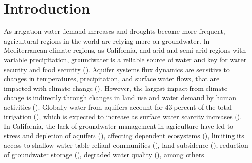 \documentclass[11pt,a4paper]{article}
\begin{document}
\section{Introduction}


As irrigation water demand increases and droughts become more frequent, agricultural regions in the world are relying more on groundwater. In Mediterranean climate regions, as California, and arid and semi-arid regions with variable precipitation, groundwater is a reliable source of water and key for water security and food security (\cite{malmgren_groundwater_2022,priyan_issues_2021}). Aquifer systems flux dynamics are sensitive to changes in temperatures, precipitation, and surface water flows, that are impacted with climate change (\cite{cuthbert_global_2019,wu_divergent_2020}).  However, the largest impact from climate change is indirectly through changes in land use and water demand by human activities (\cite{taylor_ground_2013}). Globally water from aquifers account for 43 percent of the total irrigation (\cite{siebert_groundwater_2010}), which is expected to increase as surface water scarcity increases (\cite{wada_nonsustainable_2012}). In California, the lack of groundwater management in agriculture have led to stress and depletion of aquifers (\cite{vasco_satellite-based_2019}), affecting dependent ecosystems (\cite{bierkens_non-renewable_2019}), limiting its access to shallow water-table reliant communities (\cite{pauloo_domestic_2020,perrone_dry_2017}), land subsidence (\cite{smith_groundwater_2020}),  reduction of groundwater storage (\cite{alam_post-drought_2021}), degraded water quality (\cite{levy_critical_2021}), among others. 
\end{document}
